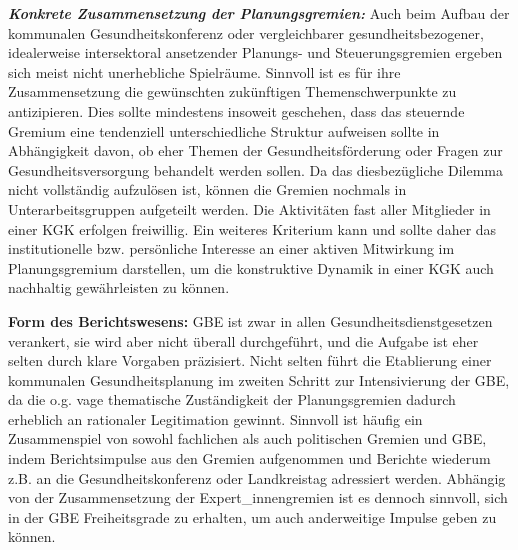 \documentclass{article}
\begin{document}
\emph{\textbf{Konkrete Zusammensetzung der Planungsgremien: }}Auch beim Aufbau der kommunalen Gesundheitskonferenz oder vergleichbarer gesundheitsbezogener, idealerweise intersektoral ansetzender Planungs- und Steuerungsgremien ergeben sich meist nicht unerhebliche Spielräume. Sinnvoll ist es für ihre Zusammensetzung die gewünschten zukünftigen Themenschwerpunkte zu antizipieren. Dies sollte mindestens insoweit geschehen, dass das steuernde Gremium eine tendenziell unterschiedliche Struktur aufweisen sollte in Abhängigkeit davon, ob eher Themen der Gesundheitsförderung oder Fragen zur Gesundheitsversorgung behandelt werden sollen. Da das diesbezügliche Dilemma nicht vollständig aufzulösen ist, können die Gremien nochmals in Unterarbeitsgruppen aufgeteilt werden\autocite{WollenbergBundweitere2019}. Die Aktivitäten fast aller Mitglieder in einer KGK erfolgen freiwillig. Ein weiteres Kriterium kann und sollte daher das institutionelle bzw. persönliche Interesse an einer aktiven Mitwirkung im Planungsgremium darstellen, um die konstruktive Dynamik in einer KGK auch nachhaltig gewährleisten zu können. 


\textbf{Form des Berichtswesens: }GBE ist zwar in allen Gesundheitsdienstgesetzen verankert, sie wird aber nicht überall durchgeführt, und die Aufgabe ist eher selten durch klare Vorgaben präzisiert. Nicht selten führt die Etablierung einer kommunalen Gesundheitsplanung im zweiten Schritt zur Intensivierung der GBE, da die o.g. vage thematische Zuständigkeit der Planungsgremien dadurch erheblich an rationaler Legitimation gewinnt. Sinnvoll ist häufig ein Zusammenspiel von sowohl fachlichen als auch politischen Gremien und GBE, indem Berichtsimpulse aus den Gremien aufgenommen und Berichte wiederum z.B. an die Gesundheitskonferenz oder Landkreistag adressiert werden. Abhängig von der Zusammensetzung der Expert\_innengremien ist es dennoch sinnvoll, sich in der GBE Freiheitsgrade zu erhalten, um auch anderweitige Impulse geben zu können.
\end{document}
